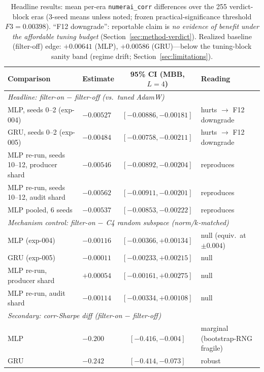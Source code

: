\begin{table}[t]
\centering
\footnotesize
\setlength{\tabcolsep}{2.5pt}
\begin{tabular}{llcl}
\toprule
Comparison & Estimate & 95\% CI (MBB, $L{=}4$) & Reading \\
\midrule
\multicolumn{4}{l}{\emph{Headline: filter-on $-$ filter-off (vs.\ tuned AdamW)}} \\
\quad MLP, seeds 0--2 (exp-004) & $-0.00527$ & $[-0.00886, -0.00181]$ & hurts $\to$ F12 downgrade \\
\quad GRU, seeds 0--2 (exp-005) & $-0.00484$ & $[-0.00758, -0.00211]$ & hurts $\to$ F12 downgrade \\
\quad MLP re-run, seeds 10--12, producer shard & $-0.00546$ & $[-0.00892, -0.00204]$ & reproduces \\
\quad MLP re-run, seeds 10--12, audit shard & $-0.00562$ & $[-0.00911, -0.00201]$ & reproduces \\
\quad MLP pooled, 6 seeds & $-0.00537$ & $[-0.00853, -0.00222]$ & reproduces \\
\midrule
\multicolumn{4}{l}{\emph{Mechanism control: filter-on $-$ C4 random subspace (norm/$k$-matched)}} \\
\quad MLP (exp-004) & $-0.00116$ & $[-0.00366, +0.00134]$ & null (equiv.\ at $\pm0.004$) \\
\quad GRU (exp-005) & $-0.00011$ & $[-0.00233, +0.00215]$ & null \\
\quad MLP re-run, producer shard & $+0.00054$ & $[-0.00161, +0.00275]$ & null \\
\quad MLP re-run, audit shard & $-0.00114$ & $[-0.00334, +0.00108]$ & null \\
\midrule
\multicolumn{4}{l}{\emph{Secondary: corr-Sharpe diff (filter-on $-$ filter-off)}} \\
\quad MLP & $-0.200$ & $[-0.416, -0.004]$ & marginal (bootstrap-RNG fragile) \\
\quad GRU & $-0.242$ & $[-0.414, -0.073]$ & robust \\
\bottomrule
\end{tabular}
\caption{Headline results: mean per-era \texttt{numerai\_corr}
  differences over the 255 verdict-block eras (3-seed means unless noted;
  frozen practical-significance threshold $F3 = 0.00398$). ``F12 downgrade'': reportable claim is \emph{no
  evidence of benefit under the affordable tuning budget}
  (Section~\ref{sec:method-verdict}). Realized baseline (filter-off) edge:
  $+0.00641$ (MLP), $+0.00586$ (GRU)---below the tuning-block sanity band
  (regime drift; Section~\ref{sec:limitations}).}
\label{tab:headline}
\end{table}

